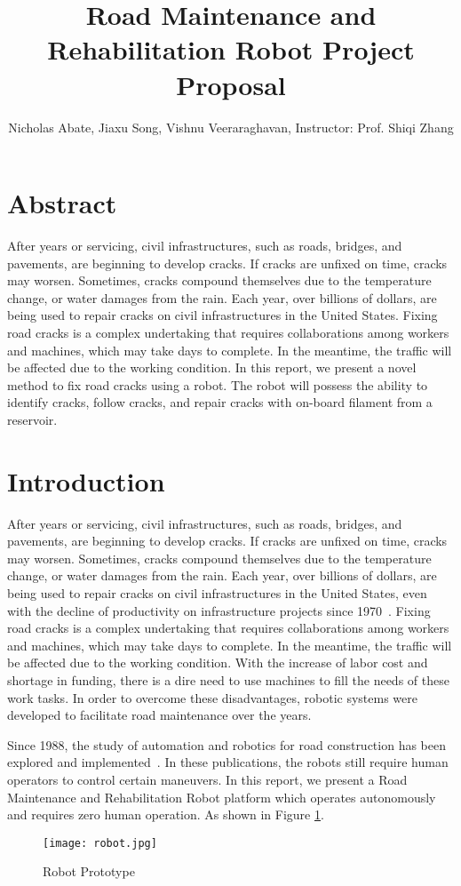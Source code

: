 \documentclass{article}
\title{\textbf{Road Maintenance and Rehabilitation Robot Project Proposal}}
\author{Nicholas Abate, Jiaxu Song, Vishnu Veeraraghavan, Instructor: Prof. Shiqi Zhang}
\date{}
\begin{document}
\maketitle
\section*{Abstract}

After years or servicing, civil infrastructures, such as roads, bridges, and pavements, are beginning to develop cracks. If cracks are unfixed on time, cracks may worsen. Sometimes, cracks compound themselves due to the temperature change, or water damages from the rain. Each year, over billions of dollars, are being used to repair cracks on civil infrastructures in the United States. Fixing road cracks is a complex undertaking that requires collaborations among workers and machines, which may take days to complete. In the meantime, the traffic will be affected due to the working condition. In this report, we present a novel method to fix road cracks using a robot. The robot will possess the ability to identify cracks, follow cracks, and repair cracks with on-board filament from a reservoir. \par



\section*{Introduction}
After years or servicing, civil infrastructures, such as roads, bridges, and pavements, are beginning to develop cracks. If cracks are unfixed on time, cracks may worsen. Sometimes, cracks compound themselves due to the temperature change, or water damages from the rain. Each year, over billions of dollars, are being used to repair cracks on civil infrastructures in the United States, even with the decline of productivity on infrastructure projects since 1970~\cite{Skibniewski1990}. Fixing road cracks is a complex undertaking that requires collaborations among workers and machines, which may take days to complete. In the meantime, the traffic will be affected due to the working condition. With the increase of labor cost and shortage in funding, there is a dire need to use machines to fill the needs of these work tasks. In order to overcome these disadvantages, robotic systems were developed to facilitate road maintenance over the years.  \par

Since 1988, the study of automation and robotics for road construction has been explored and implemented~\cite{Deb2013, Hong1997, Maynard2005}. In these publications, the robots still require human operators to control certain maneuvers. In this report, we present a Road Maintenance and Rehabilitation Robot platform which operates autonomously and requires zero human operation. As shown in Figure \ref{fig:robot}. 
\begin{figure}[htbp]
	\centering
	\texttt{[image: robot.jpg]}
	\caption{Robot Prototype}
	\label{fig:robot}
\end{figure}
\end{document}
